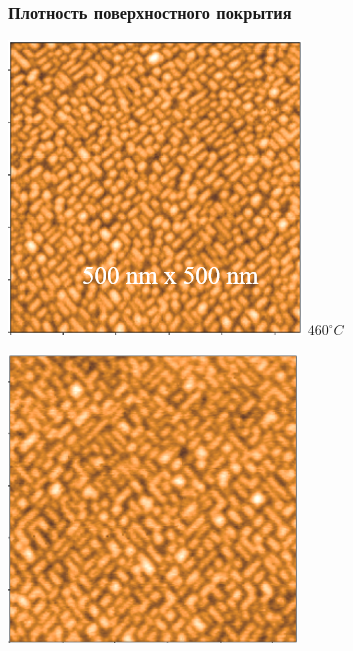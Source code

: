 \documentclass[10pt,pdf,hyperref={unicode}, dvipsnames]{beamer}
\begin{document}
\begin{frame}[t]
	\frametitle{Плотность поверхностного покрытия}
	\centering
	\begin{minipage}{0.32\linewidth}	
		\centering
		\includegraphics[width = \linewidth]{imgs/exp/460.png}
		$460^{\circ}C$	
	\end{minipage}
	\begin{minipage}{0.32\linewidth}	
		\centering
		\includegraphics[width = \linewidth]{imgs/exp/500.png}

\end{minipage}
\end{frame}
\end{document}
